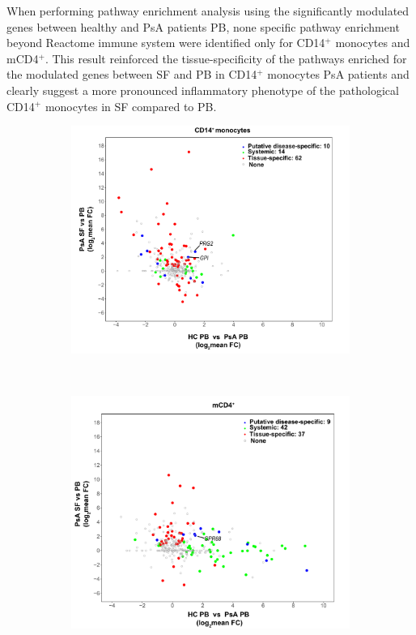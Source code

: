 When performing pathway enrichment analysis using the significantly modulated genes between healthy and PsA patients PB, none specific pathway enrichment beyond Reactome immune system were identified only for CD14$^+$ monocytes and mCD4$^+$. This result reinforced the tissue-specificity of the pathways enriched for the modulated genes between SF and PB in CD14$^+$ monocytes PsA patients and clearly suggest a more pronounced inflammatory phenotype of the pathological CD14$^+$ monocytes in SF compared to PB.

\begin{figure}[htbp]
\centering
\begin{subfigure}{0.5\textwidth}
\centering
\includegraphics[width=\textwidth]{./Results3/pdfs/PSA_array_correlation_CD14_FC_HVPsA_vs_SFPBPsA}
\caption{\textbf{}}
\end{subfigure} \\
\begin{subfigure}{0.5\textwidth}
\centering
\includegraphics[width=\textwidth]{./Results3/pdfs/PSA_array_correlation_CD4_FC_HVPsA_vs_SFPBPsA}

\end{subfigure}
\end{figure}
